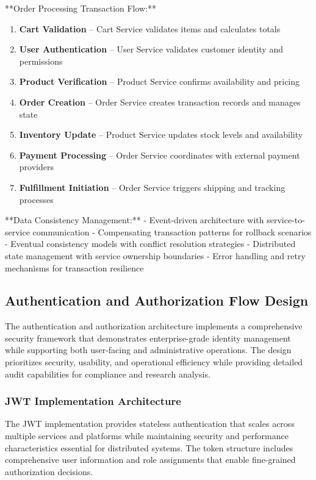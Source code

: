 **Order Processing Transaction Flow:**
\begin{enumerate}
\item \textbf{Cart Validation} -- Cart Service validates items and calculates totals
\item \textbf{User Authentication} -- User Service validates customer identity and permissions
\item \textbf{Product Verification} -- Product Service confirms availability and pricing
\item \textbf{Order Creation} -- Order Service creates transaction records and manages state
\item \textbf{Inventory Update} -- Product Service updates stock levels and availability
\item \textbf{Payment Processing} -- Order Service coordinates with external payment providers
\item \textbf{Fulfillment Initiation} -- Order Service triggers shipping and tracking processes
\end{enumerate}

**Data Consistency Management:**
- Event-driven architecture with service-to-service communication
- Compensating transaction patterns for rollback scenarios
- Eventual consistency models with conflict resolution strategies
- Distributed state management with service ownership boundaries
- Error handling and retry mechanisms for transaction resilience

\subsection{Authentication and Authorization Flow Design}

The authentication and authorization architecture implements a comprehensive security framework that demonstrates enterprise-grade identity management while supporting both user-facing and administrative operations. The design prioritizes security, usability, and operational efficiency while providing detailed audit capabilities for compliance and research analysis.

\subsubsection{JWT Implementation Architecture}
The JWT implementation provides stateless authentication that scales across multiple services and platforms while maintaining security and performance characteristics essential for distributed systems. The token structure includes comprehensive user information and role assignments that enable fine-grained authorization decisions.

